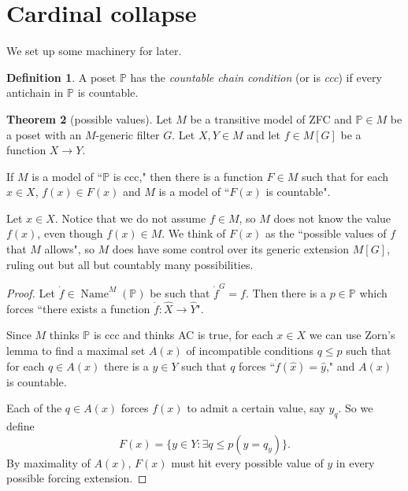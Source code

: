 \documentclass[12pt]{report}
\newcommand{\PP}{\mathbb{P}}
\DeclareMathOperator{\Name}{Name}
\newcommand{\dfn}[1]{\emph{#1}\index{#1}}
\theoremstyle{definition}
\newtheorem{theorem}{Theorem}[chapter]
\newtheorem{definition}[theorem]{Definition}
\begin{document}
\section{Cardinal collapse}
    We set up some machinery for later.
\begin{definition}
    A poset $\PP$ has the \dfn{countable chain condition} (or is \dfn{ccc}) if every antichain in $\PP$ is countable.
\end{definition}

\begin{theorem}[possible values]
    Let $M$ be a transitive model of ZFC and $\PP \in M$ be a poset with an $M$-generic filter $G$. Let $X, Y \in M$ and let $f \in M[G]$ be a function $X \to Y$.

    If $M$ is a model of ``$\PP$ is ccc," then there is a function $F \in M$ such that for each $x \in X$, $f(x) \in F(x)$ and $M$ is a model of ``$F(x)$ is countable".
\end{theorem}
    Let $x \in X$. Notice that we do not assume $f \in M$, so $M$ does not know the value $f(x)$, even though $f(x) \in M$. We think of $F(x)$ as the ``possible values of $f$ that $M$ allows", so $M$ does have some control over its generic extension $M[G]$, ruling out but all but countably many possibilities.
\begin{proof}
    Let $\dot f \in \Name^M(\PP)$ be such that $\dot f^G = f$. Then there is a $p \in \PP$ which forces ``there exists a function $\dot f: \hat X \to \hat Y$".

    Since $M$ thinks $\PP$ is ccc and thinks AC is true, for each $x \in X$ we can use Zorn's lemma to find a maximal set $A(x)$ of incompatible conditions $q \leq p$ such that for each $q \in A(x)$ there is a $y \in Y$ such that $q$ forces ``$\dot f(\hat x) = \hat y$," and $A(x)$ is countable.

    Each of the $q \in A(x)$ forces $f(x)$ to admit a certain value, say $y_q$. So we define
    $$F(x) = \{y \in Y: \exists q \leq p(y = q_y)\}.$$
    By maximality of $A(x)$, $F(x)$ must hit every possible value of $y$ in every possible forcing extension.
\end{proof}
\end{document}
